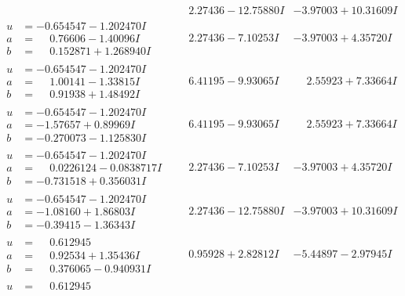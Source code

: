 \documentclass[1p]{elsarticle_modified}
\theoremstyle{definition}
\begin{document}
$$\begin{array}{c|c|c}
 & \phantom{-}2.27436 - 12.75880 I & -3.97003 + 10.31609 I \\ \hline\begin{aligned}
u &= -0.654547 - 1.202470 I \\
a &= \phantom{-}0.76606 - 1.40096 I \\
b &= \phantom{-}0.152871 + 1.268940 I\end{aligned}
 & \phantom{-}2.27436 - 7.10253 I & -3.97003 + 4.35720 I \\ \hline\begin{aligned}
u &= -0.654547 - 1.202470 I \\
a &= \phantom{-}1.00141 - 1.33815 I \\
b &= \phantom{-}0.91938 + 1.48492 I\end{aligned}
 & \phantom{-}6.41195 - 9.93065 I & \phantom{-}2.55923 + 7.33664 I \\ \hline\begin{aligned}
u &= -0.654547 - 1.202470 I \\
a &= -1.57657 + 0.89969 I \\
b &= -0.270073 - 1.125830 I\end{aligned}
 & \phantom{-}6.41195 - 9.93065 I & \phantom{-}2.55923 + 7.33664 I \\ \hline\begin{aligned}
u &= -0.654547 - 1.202470 I \\
a &= \phantom{-}0.0226124 - 0.0838717 I \\
b &= -0.731518 + 0.356031 I\end{aligned}
 & \phantom{-}2.27436 - 7.10253 I & -3.97003 + 4.35720 I \\ \hline\begin{aligned}
u &= -0.654547 - 1.202470 I \\
a &= -1.08160 + 1.86803 I \\
b &= -0.39415 - 1.36343 I\end{aligned}
 & \phantom{-}2.27436 - 12.75880 I & -3.97003 + 10.31609 I \\ \hline\begin{aligned}
u &= \phantom{-}0.612945\phantom{ +0.000000I} \\
a &= \phantom{-}0.92534 + 1.35436 I \\
b &= \phantom{-}0.376065 - 0.940931 I\end{aligned}
 & \phantom{-}0.95928 + 2.82812 I & -5.44897 - 2.97945 I \\ \hline\begin{aligned}
u &= \phantom{-}0.612945\phantom{ +0.000000I} \\

\end{aligned}
\end{array}$$
\end{document}
